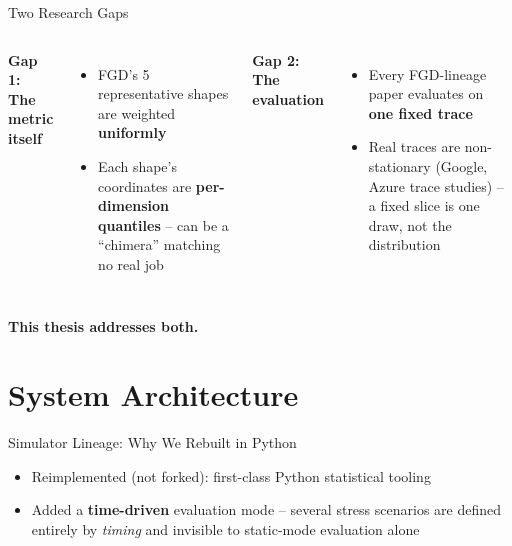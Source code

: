\documentclass[aspectratio=169]{beamer}
\begin{document}
\begin{frame}{Two Research Gaps}
\begin{columns}
\textbf{Gap 1: The metric itself}
\begin{itemize}
  \item FGD's 5 representative shapes are weighted \textbf{uniformly}
  \item Each shape's coordinates are \textbf{per-dimension quantiles} --
    can be a ``chimera'' matching no real job
\end{itemize}
\textbf{Gap 2: The evaluation}
\begin{itemize}
  \item Every FGD-lineage paper evaluates on \textbf{one fixed trace}
  \item Real traces are non-stationary (Google, Azure trace studies) --
    a fixed slice is one draw, not the distribution
\end{itemize}
\end{columns}
\vspace{0.5cm}
\centering
\textbf{This thesis addresses both.}
\end{frame}

\section{System Architecture}
\begin{frame}{Simulator Lineage: Why We Rebuilt in Python}
\centering
{}
\vspace{0.4cm}
\begin{itemize}
  \item Reimplemented (not forked): first-class Python statistical tooling
  \item Added a \textbf{time-driven} evaluation mode -- several stress
    scenarios are defined entirely by \emph{timing} and invisible to
    static-mode evaluation alone
\end{itemize}
\end{frame}
\end{document}
